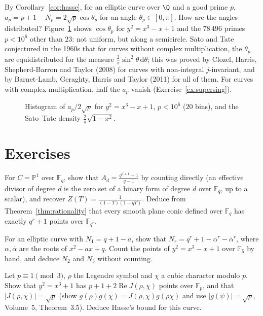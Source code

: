 \begin{remark}
By Corollary~\ref{cor:hasse}, for an elliptic curve over $\Q$ and a good prime $p$, $a_p=p+1-N_p=2\sqrt p\cos\theta_p$ for an angle $\theta_p\in[0,\pi]$. How are
the angles distributed? Figure~\ref{fig:satotate} shows $\cos\theta_p$ for $y^2=x^3-x+1$ and the $78\,496$ primes $p<10^6$ other than $23$: not uniform, but along a
semicircle. Sato and Tate conjectured in the 1960s that for curves without complex multiplication, the $\theta_p$ are equidistributed for the measure
$\frac2\pi\sin^2\theta\,\mathrm d\theta$; this was proved by Clozel, Harris, Shepherd-Barron and Taylor (2008) for curves with non-integral $j$-invariant, and by
Barnet-Lamb, Geraghty, Harris and Taylor (2011) for all of them. For curves with complex multiplication, half the $a_p$ vanish (Exercise~\ref{ex:supersing}).
\end{remark}

\begin{figure}[ht]
\centering{}
\caption{Histogram of $a_p/2\sqrt p$ for $y^2=x^3-x+1$, $p<10^6$ ($20$ bins), and the Sato--Tate density $\frac2\pi\sqrt{1-x^2}$.}
\label{fig:satotate}
\end{figure}

\section{Exercises}

\begin{exercise}[$\star$]\label{ex:zetaP1}
For $C=\mathbb P^1$ over $\mathbb F_q$, show that $A_d=\frac{q^{d+1}-1}{q-1}$ by counting directly (an effective divisor of degree $d$ is the zero set of a binary form of
degree $d$ over $\mathbb F_q$, up to a scalar), and recover $Z(T)=\frac1{(1-T)(1-qT)}$. Deduce from Theorem~\ref{thm:rationality} that every smooth plane conic defined
over $\mathbb F_q$ has exactly $q^r+1$ points over $\mathbb F_{q^r}$.
\end{exercise}

\begin{exercise}[$\star$]\label{ex:ellNr}
For an elliptic curve with $N_1=q+1-a$, show that $N_r=q^r+1-\alpha^r-\overline\alpha^r$, where $\alpha,\overline\alpha$ are the roots of $x^2-ax+q$. Count the points of
$y^2=x^3-x+1$ over $\mathbb F_5$ by hand, and deduce $N_2$ and $N_3$ without counting.
\end{exercise}

\begin{exercise}[$\star\star$]\label{ex:jacobicount}
Let $p\equiv1\pmod3$, $\rho$ the Legendre symbol and $\chi$ a cubic character modulo $p$. Show that $y^2=x^3+1$ has $p+1+2\operatorname{Re}J(\rho,\chi)$ points over
$\mathbb F_p$, and that $|J(\rho,\chi)|=\sqrt p$ (show $g(\rho)g(\chi)=J(\rho,\chi)g(\rho\chi)$ and use $|g(\psi)|=\sqrt p$, Volume~5, Theorem~3.5). Deduce Hasse's bound for this
curve.
\end{exercise}

